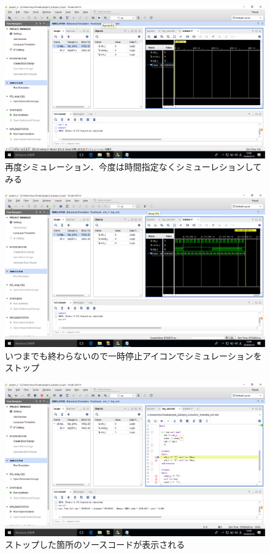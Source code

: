\documentclass[a4paper,dvipdfmx]{jsarticle}
\begin{document}
 \begin{figure}[H]
  \begin{center}
   \includegraphics[width=.8\textwidth]{chapter04_figures/VirtualBox_Windows10_19_03_2018_12_08_58.png}
  \end{center}
  \caption{再度シミュレーション．今度は時間指定なくシミューレションしてみる}
 \end{figure}

 \begin{figure}[H]
  \begin{center}
   \includegraphics[width=.8\textwidth]{chapter04_figures/VirtualBox_Windows10_19_03_2018_12_09_04.png}
  \end{center}
  \caption{いつまでも終わらないので一時停止アイコンでシミュレーションをストップ}
 \end{figure}

 \begin{figure}[H]
  \begin{center}
   \includegraphics[width=.8\textwidth]{chapter04_figures/VirtualBox_Windows10_19_03_2018_12_09_10.png}
  \end{center}
  \caption{ストップした箇所のソースコードが表示される}
 \end{figure}
\end{document}
